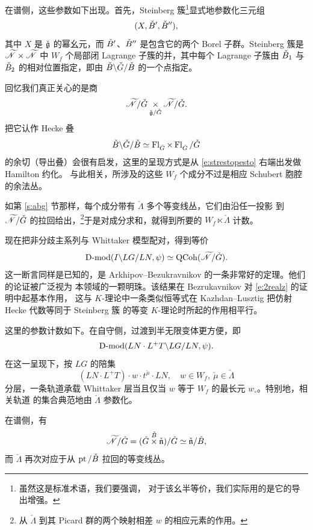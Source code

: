 在谱侧，这些参数如下出现。首先，Steinberg 簇\footnote{虽然这是标准术语，我们要强调，
对于该幺半等价，我们实际用的是它的导出增强。}显式地参数化三元组
\[
(X, \check{B}', \check{B}''),
\]
其中 $X$ 是 $\check{\mathfrak{g}}$ 的幂幺元，而 $\check{B}'$、$\check{B}''$ 是包含它的两个 Borel 子群。Steinberg 簇是
$\widetilde{\mathscr{N}} \times \widetilde{\mathscr{N}}$ 中 $W_f$ 个局部闭 Lagrange 子簇的并，其中每个
Lagrange 子簇由 $\check{B}_1$ 与 $\check{B}_2$ 的相对位置指定，即由 $\check{B} \backslash \check{G} / \check{B}$ 的一个点指定。

\begin{re} 回忆我们真正关心的是商
\[
\widetilde{\mathscr{N}} / \check{G} \underset {\check{\mathfrak{g}}/\check{G}} \times \widetilde{\mathscr{N}} / \check{G}.
\]
把它认作 Hecke 叠
\begin{equation} \label{e:strestopesto} \check{B} \backslash \check{G} / \check{B} \simeq \operatorname{Fl}_{\check{G}} \times \operatorname{Fl}_{\check{G}} / \check{G}
\end{equation}
的余切（导出叠）会很有启发，这里的呈现方式是从 \eqref{e:strestopesto} 右端出发做 Hamilton 约化。
与此相关，所涉及的这些 $W_f$ 个成分不过是相应 Schubert 胞腔的余法丛。
\end{re}

如第 \ref{s:abg} 节那样，每个成分带有 $\check{\Lambda}$ 多个等变线丛，它们由沿任一投影
到 $\widetilde{\mathscr{N}}/\check{G}$ 的拉回给出，\footnote{从 $\check{\Lambda}$ 到其 Picard 群的两个映射相差
$w$ 的相应元素的作用。}于是对成分求和，就得到所要的 $W_f \ltimes \check{\Lambda}$ 计数。

\ssszh 现在把非分歧主系列与 Whittaker 模型配对，得到等价
%
\begin{equation} \label{e:arkbez}
    \operatorname{D-mod}( I \backslash LG / LN, \psi) \simeq \operatorname{QCoh}( \widetilde{\mathscr{N}} / \check{G}).
\end{equation}
%
这一断言同样是已知的，是 Arkhipov--Bezukravnikov \cite{ab} 的一条非常好的定理。他们的论证被广泛视为
本领域的一颗明珠。该结果在 Bezrukavnikov 对 \eqref{e:2realz} 的证明中起基本作用，
这与 $K$-理论中一条类似恒等式在 Kazhdan--Lusztig 把仿射 Hecke 代数等同于 Steinberg 簇
的等变 $K$-理论时所起的作用相平行。

这里的参数计数如下。在自守侧，过渡到半无限变体更方便，即
\begin{equation} \label{e:semiinfre}  \operatorname{D-mod}( LN \cdot L^+T \backslash LG / LN,
\psi).\end{equation}
在这一呈现下，按 $LG$ 的陪集
\[ (LN \cdot L^+T) \cdot w \cdot t^{\check{\mu}} \cdot LN,   \quad w
\in W_f,\ \check{\mu} \in \check{\Lambda} \]
分层，一条轨道承载 Whittaker 层当且仅当 $w$ 等于 $W_f$ 的最长元 $w_\circ$。特别地，相关轨道
的集合典范地由 $\check{\Lambda}$ 参数化。

在谱侧，有
%
\[
    \widetilde{\mathscr{N}} / \check{G} = (\check{G} \overset {\check{B}} \times \check{\mathfrak{n}}) / \check{G} \simeq
    \check{\mathfrak{n}} / \check{B},
\]
%
而 $\check{\Lambda}$ 再次对应于从 $\operatorname{pt} / \check{B}$ 拉回的等变线丛。

